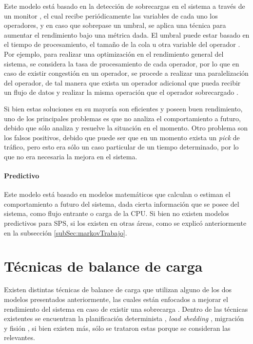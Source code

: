 Este modelo está basado en la detección de sobrecargas en el sistema a través de un monitor \citep{GulisanoJPSV12}, el cual recibe periódicamente las variables de cada uno los operadores, y en caso que sobrepase un umbral, se aplica una técnica para aumentar el rendimiento bajo una métrica dada. El umbral puede estar basado en el tiempo de procesamiento, el tamaño de la cola u otra variable del operador \citep{BhuvanagiriGKS06}. Por ejemplo, para realizar una optimización en el rendimiento general del sistema, se considera la tasa de procesamiento de cada operador, por lo que en caso de existir congestión en un operador, se procede a realizar una paralelización del operador, de tal manera que exista un operador adicional que pueda recibir un flujo de datos y realizar la misma operación que el operador sobrecargado \citep{SchneiderAGBW09}.

Si bien estas soluciones en su mayoría son eficientes y poseen buen rendimiento, uno de los principales problemas es que no analiza el comportamiento a futuro, debido que sólo analiza y resuelve la situación en el momento. Otro problema son los falsos positivos, debido que puede ser que en un momento exista un \textit{pick} de tráfico, pero esto era sólo un caso particular de un tiempo determinado, por lo que no era necesaria la mejora en el sistema.

\paragraph{Predictivo}

Este modelo está basado en modelos matemáticos que calculan o estiman el comportamiento a futuro del sistema, dada cierta información que se posee del sistema, como flujo entrante o carga de la CPU. Si bien no existen modelos predictivos para SPS, si los existen en otras áreas, como se explicó anteriormente en la subsección \ref{subSec:markovTrabajo}.

\section{Técnicas de balance de carga}
\label{sec:tecnicasBC}

Existen distintas técnicas de balance de carga que utilizan alguno de los dos modelos presentados anteriormente, las cuales están enfocados a mejorar el rendimiento del sistema en caso de existir una sobrecarga \citep{HirzelSSGG13}. Dentro de las técnicas existentes se encuentran la planificación determinista \citep{XuCTS14, DongTS07}, \textit{load shedding} \citep{SheuC09}, migración \citep{XingZH05} y fisión \citep{GulisanoJPSV12, IshiiS11, GedikSHW14, FernandezMKP13}, si bien existen más, sólo se trataron estas porque se consideran las relevantes.

